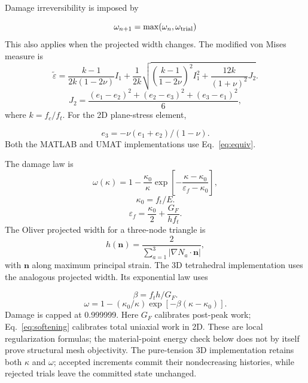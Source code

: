 \documentclass[preprint,11pt,a4paper]{elsarticle}
\begin{document}
Damage irreversibility is imposed by

\begin{equation}
\omega_{n+1}=\max(\omega_n,\omega_{\rm trial})
\end{equation}
This also applies when the projected width changes. The modified von Mises measure is
\begin{equation}
\tilde\varepsilon = \frac{k-1}{2k(1-2\nu)}I_1
  + \frac{1}{2k}\sqrt{\left(\frac{k-1}{1-2\nu}\right)^2I_1^2
  + \frac{12k}{(1+\nu)^2}J_2}.
\label{eq:equiv}
\end{equation}
\begin{equation}
J_2=\frac{(e_1-e_2)^2+(e_2-e_3)^2+(e_3-e_1)^2}{6},
\end{equation}
where $k=f_c/f_t$. For the 2D plane-stress element,

\begin{equation}
e_3=-\nu(e_1+e_2)/(1-\nu).
\end{equation}
Both the MATLAB and UMAT implementations use Eq.~\eqref{eq:equiv}.

The damage law is
\begin{equation}
\omega(\kappa)=1-\frac{\kappa_0}{\kappa}
\exp\!\left[-\frac{\kappa-\kappa_0}{\varepsilon_f-\kappa_0}\right],
\label{eq:softening}
\end{equation}
\begin{equation}
\kappa_0=f_t/E.
\end{equation}
\begin{equation}
\varepsilon_f=\frac{\kappa_0}{2}+\frac{G_F}{h f_t}.
\end{equation}
The Oliver projected width for a three-node triangle is
\begin{equation}
h(\mathbf n)=\frac{2}{\sum_{a=1}^3|\nabla N_a\cdot\mathbf n|},
\label{eq:oliver-t3}
\end{equation}
with $\mathbf n$ along maximum principal strain. The 3D tetrahedral
implementation uses the analogous projected width. Its exponential law uses

\begin{equation}
\beta=f_t h/G_F.
\end{equation}
\begin{equation}
\omega=1-(\kappa_0/\kappa)\exp[-\beta(\kappa-\kappa_0)].
\end{equation}
Damage is capped at 0.999999. Here $G_F$
calibrates post-peak work; Eq.~\eqref{eq:softening} calibrates total
uniaxial work in 2D. These are local
regularization formulas; the material-point energy check below does not
by itself prove structural mesh objectivity.
The pure-tension 3D implementation retains both $\kappa$ and $\omega$;
accepted increments commit their nondecreasing histories, while rejected
trials leave the committed state unchanged.
\end{document}
